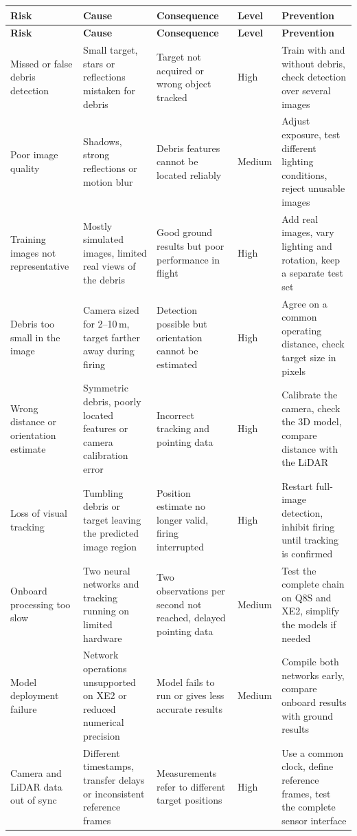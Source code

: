 \documentclass[11pt,a4paper]{article}
\newcommand{\risqueentete}{%
  \toprule
  \textbf{Risk} & \textbf{Cause} & \textbf{Consequence} & \textbf{Level} & \textbf{Prevention} \\
  \midrule
  \endfirsthead
  \toprule
  \textbf{Risk} & \textbf{Cause} & \textbf{Consequence} & \textbf{Level} & \textbf{Prevention} \\
  \midrule
  \endhead
  \bottomrule
  \endfoot
}
\begin{document}
\begin{longtable}{>{\raggedright\arraybackslash}p{3.7cm} >{\raggedright\arraybackslash}p{4.2cm} >{\raggedright\arraybackslash}p{3.7cm} >{\centering\arraybackslash}p{1.4cm} >{\raggedright\arraybackslash}p{4.0cm}}
\risqueentete
Missed or false debris detection & Small target, stars or reflections mistaken for debris & Target not acquired or wrong object tracked & High & Train with and without debris, check detection over several images \\
Poor image quality & Shadows, strong reflections or motion blur & Debris features cannot be located reliably & Medium & Adjust exposure, test different lighting conditions, reject unusable images \\
Training images not representative & Mostly simulated images, limited real views of the debris & Good ground results but poor performance in flight & High & Add real images, vary lighting and rotation, keep a separate test set \\
Debris too small in the image & Camera sized for 2--10\,m, target farther away during firing & Detection possible but orientation cannot be estimated & High & Agree on a common operating distance, check target size in pixels \\
Wrong distance or orientation estimate & Symmetric debris, poorly located features or camera calibration error & Incorrect tracking and pointing data & High & Calibrate the camera, check the 3D model, compare distance with the LiDAR \\
Loss of visual tracking & Tumbling debris or target leaving the predicted image region & Position estimate no longer valid, firing interrupted & High & Restart full-image detection, inhibit firing until tracking is confirmed \\
Onboard processing too slow & Two neural networks and tracking running on limited hardware & Two observations per second not reached, delayed pointing data & Medium & Test the complete chain on Q8S and XE2, simplify the models if needed \\
Model deployment failure & Network operations unsupported on XE2 or reduced numerical precision & Model fails to run or gives less accurate results & Medium & Compile both networks early, compare onboard results with ground results \\
Camera and LiDAR data out of sync & Different timestamps, transfer delays or inconsistent reference frames & Measurements refer to different target positions & High & Use a common clock, define reference frames, test the complete sensor interface \\
\end{longtable}
\end{document}
